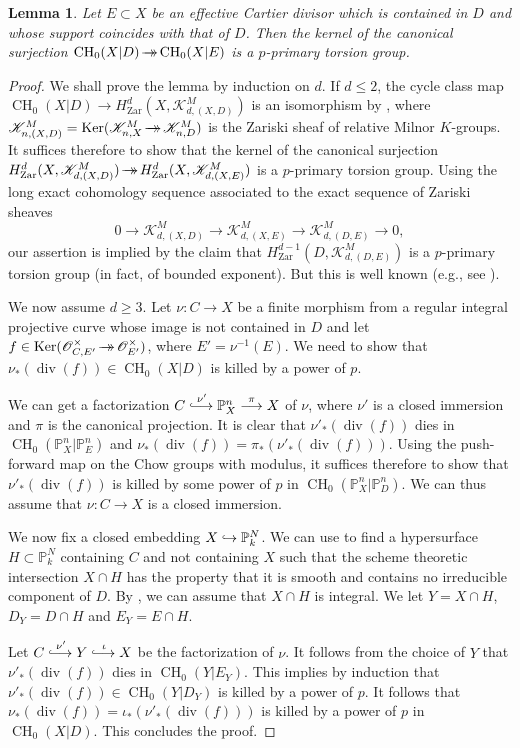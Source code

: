 \documentclass[JEP,XML,SOM,Unicode,published]{cedram}
\let\mathcal\mathscr
\def\hto{\mathrel{\lhook\joinrel\to}}
\newcommand{\onto}{\mathchoice{\to\hspace*{-5mm}\to}{\hspace*{-.5mm}\to\hspace*{-2.85mm}\to\hspace*{-.5mm}}{\to\hspace*{-3mm}\to}{\to\hspace*{-3mm}\to}}
\def\To#1{\mathchoice{\xrightarrow{\textstyle\kern4pt#1\kern3pt}}{\stackrel{#1}{\longrightarrow}}{}{}}
\def\Hto#1{\mathrel{\lhook\joinrel\To{#1}}}
\let\surj\onto
\let\inj\hto
\newtheorem{lem}[thm]{Lemma}
\theoremstyle{definition}
\newcommand{\sK}{{\mathcal K}}
\newcommand{\sO}{{\mathcal O}}\let\cO\sO
\renewcommand{\P}{{\mathbb P}}
\DeclareMathOperator{\CH}{CH}
\DeclareMathOperator{\divf}{div}
\DeclareMathOperator{\Ker}{Ker}
\newcommand{\zar}{\mathrm{Zar}}
\begin{document}
\begin{lem}\label{lem:Kernel-mod}
Let $E \subset X$ be an effective Cartier divisor which is contained in $D$ and
whose support coincides with that of $D$. Then the kernel of the canonical surjection
$\CH_0(X|D) \surj \CH_0(X|E)$ is a $p$-primary torsion group.
\end{lem}
\begin{proof}
We shall prove the lemma by induction on $d$.
If $d \le 2$, the cycle class map $\CH_0(X|D) \to H^{d}_\zar(X, \sK^M_{d, (X,D)})$
is an isomorphism by \cite[Th.\,1.8]{BK}, where $\sK^M_{n, (X,D)} =
\Ker(\sK^M_{n, X} \surj \sK^M_{n,D})$ is the Zariski sheaf of relative Milnor $K$\nobreakdash-groups.
It suffices therefore to show that the kernel of the canonical surjection
$H^{d}_\zar(X, \sK^M_{d, (X,D)}) \surj H^{d}_\zar(X, \sK^M_{d, (X,E)})$ is
a $p$-primary torsion group.
Using the long exact cohomology sequence associated to the exact sequence of
Zariski sheaves
\[
0 \to \sK^M_{d, (X,D)} \to \sK^M_{d, (X,E)} \to \sK^M_{d, (D,E)} \to 0,
\]
our assertion is implied by the claim that $H^{d-1}_\zar(D, \sK^M_{d, (D, E)})$ is a
$p$-primary torsion group (in fact, of bounded exponent).
But this is well known (e.g., see \cite[Lem.\,2.6]{GKris}).

We now assume $d \ge 3$.
Let $\nu \colon C \to X$ be a finite morphism from a regular integral
projective curve whose image is not contained in $D$
and let $f \in \Ker(\sO^{\times}_{C,E'} \surj \sO^{\times}_{E'})$,
where $E' = \nu^{-1}(E)$. We need to show that $\nu_*(\divf(f)) \in
\CH_0(X|D)$ is killed by a power of $p$.

We can get a factorization $C \Hto{\nu'}
\P^n_X \To{\pi} X$ of $\nu$, where $\nu'$ is a closed
immersion and $\pi$ is the canonical projection. It is
clear that $\nu'_*(\divf(f))$ dies in $\CH_0(\P^n_X|\P^n_E)$ and
$\nu_*(\divf(f)) = \pi_*(\nu'_*(\divf(f)))$.
Using the push-forward map on the Chow groups with modulus,
it suffices therefore to show that
$\nu'_*(\divf(f))$ is killed by some power of $p$ in $\CH_0(\P^n_X|\P^n_D)$.
We can thus assume that $\nu \colon C \to X$ is a closed immersion.

We now fix a closed embedding $X \inj \P^N_k$. We can use \cite[Th.\,7]{AK}
to find a hypersurface $H \subset \P^N_k$ containing $C$ and not containing $X$
such that the scheme theoretic intersection $X \cap H$
has the property that it is smooth and contains
no irreducible component of $D$. By \cite[Cor.\,3.13]{GK}, we can assume
that $X \cap H$ is integral. We let $Y = X \cap H$, $D_Y = D \cap H$
and $E_Y = E \cap H$.

Let $C \Hto{\nu'} Y \Hto{\iota} X$
be the factorization of $\nu$.
It follows from the choice of $Y$ that
$\nu'_*(\divf(f))$ dies in $\CH_0(Y| E_Y)$. This implies by induction that
$\nu'_*(\divf(f)) \in \CH_0(Y|D_Y)$ is killed by a power of $p$.
It follows that $\nu_*(\divf(f)) = \iota _* (\nu'_*(\divf(f)))$
is killed by a power of $p$ in $\CH_0(X|D)$. This concludes the proof.
\end{proof}
\end{document}
